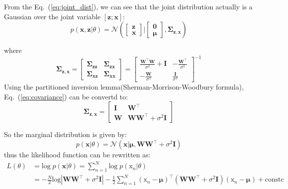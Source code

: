 \documentclass{article}
\begin{document}
From the Eq.~(\ref{eq:joint_dist}), we can see that the joint distribution  actually is a Gaussian over the joint variable $\left[\mathbf z;\mathbf x\right]$:
\begin{equation}
    p\left(\mathbf x, \mathbf z| \theta \right) = \mathcal N \left(\begin{bmatrix}
    \mathbf z\\
    \mathbf x
    \end{bmatrix}|\begin{bmatrix}
    \mathbf 0 \\
    \boldsymbol \mu
    \end{bmatrix}, \boldsymbol \Sigma_{\mathbf z, \mathbf x}\right)
\end{equation}

where
\begin{equation}
	\boldsymbol \Sigma_{\mathbf z, \mathbf x} = \begin{bmatrix}
	\boldsymbol \Sigma_{\mathbf z \mathbf z} & \boldsymbol \Sigma_{\mathbf z \mathbf x}\\
	 \boldsymbol \Sigma_{\mathbf x \mathbf z} & \boldsymbol \Sigma_{\mathbf x \mathbf x}
	\end{bmatrix} = \begin{bmatrix}
	\frac{\mathbf W^\top\mathbf W}{\sigma^2} + \mathbf I     & -\frac{\mathbf W^\top}{\sigma^2}      \\
	-\frac{\mathbf W}{\sigma^2}  & \frac{\mathbf I}{\sigma^2} \label{eq:covariance}
	\end{bmatrix}^{-1}
\end{equation}
Using the partitioned inversion lemma(Sherman-Morrison-Woodbury formula), Eq.~(\ref{eq:covariance}) can be convertd to:
\begin{equation}
\boldsymbol \Sigma_{\mathbf z, \mathbf x} = \begin{bmatrix}
\mathbf I & \mathbf W^\top \\
\mathbf W & \mathbf W \mathbf W^\top + \sigma^2 \mathbf I
\end{bmatrix}
\end{equation}

So the marginal distribution is given by:
\begin{equation}
p\left(\mathbf x| \theta \right) = \mathcal N \left(\mathbf x|\boldsymbol \mu, \mathbf W \mathbf W^\top + \sigma^2 \mathbf I\right)
\end{equation}
thus the likelihood function can be rewritten as:
\begin{align}
	L\left(\theta\right) &= \mbox{log}\; p\left(\mathbf x| \theta \right) = \sum_{n=1}^{N} \mbox{log} \; p\left(\mathrm x_n| \theta \right)\\
	&= -\frac{N}{2}\mbox{log} \left|\mathbf W \mathbf W^\top + \sigma^2 \mathbf I\right| - \frac{1}{2}\sum_{n=1}^{N} \left(\mathrm x_n - \boldsymbol \mu\right)^\top \left(\mathbf W \mathbf W^\top + \sigma^2 \mathbf I\right) \left(\mathrm x_n - \boldsymbol \mu\right) + \mbox{constc}
\end{align}
\end{document}
